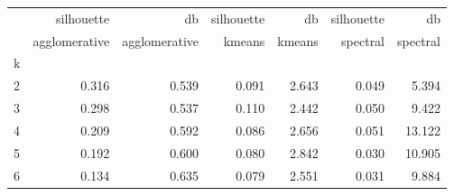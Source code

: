 \begin{tabular}{lrrrrrr}
\toprule
{} &    silhouette &            db & silhouette &     db & silhouette &       db \\
{} & agglomerative & agglomerative &     kmeans & kmeans &   spectral & spectral \\
k &               &               &            &        &            &          \\
\midrule
2 &         0.316 &         0.539 &      0.091 &  2.643 &      0.049 &    5.394 \\
3 &         0.298 &         0.537 &      0.110 &  2.442 &      0.050 &    9.422 \\
4 &         0.209 &         0.592 &      0.086 &  2.656 &      0.051 &   13.122 \\
5 &         0.192 &         0.600 &      0.080 &  2.842 &      0.030 &   10.905 \\
6 &         0.134 &         0.635 &      0.079 &  2.551 &      0.031 &    9.884 \\
\bottomrule
\end{tabular}
